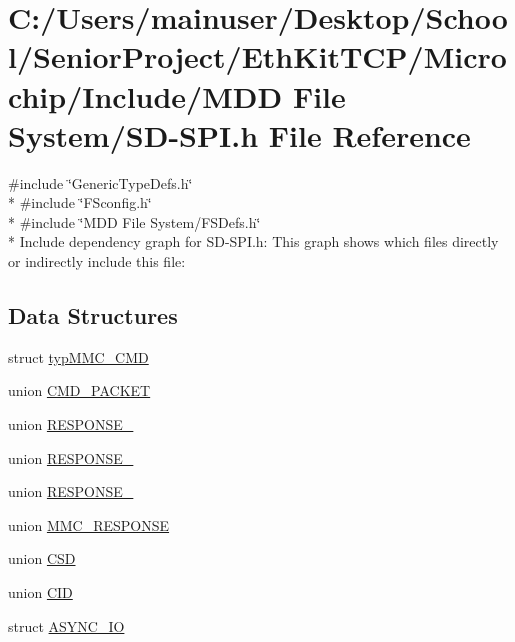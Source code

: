 \hypertarget{_s_d-_s_p_i_8h}{}\section{C\+:/\+Users/mainuser/\+Desktop/\+School/\+Senior\+Project/\+Eth\+Kit\+T\+C\+P/\+Microchip/\+Include/\+M\+D\+D File System/\+S\+D-\/\+S\+P\+I.h File Reference}
\label{_s_d-_s_p_i_8h}
{\ttfamily \#include \char`\"{}Generic\+Type\+Defs.\+h\char`\"{}}\\*
{\ttfamily \#include \char`\"{}F\+Sconfig.\+h\char`\"{}}\\*
{\ttfamily \#include \char`\"{}M\+D\+D File System/\+F\+S\+Defs.\+h\char`\"{}}\\*
Include dependency graph for S\+D-\/\+S\+P\+I.h\+:
This graph shows which files directly or indirectly include this file\+:
\subsection*{Data Structures}
\begin{DoxyCompactItemize}
\item 
struct \hyperlink{structtyp_m_m_c___c_m_d}{typ\+M\+M\+C\+\_\+\+C\+M\+D}
\item 
union \hyperlink{union_c_m_d___p_a_c_k_e_t}{C\+M\+D\+\_\+\+P\+A\+C\+K\+E\+T}
\item 
union \hyperlink{union_r_e_s_p_o_n_s_e__1}{R\+E\+S\+P\+O\+N\+S\+E\+\_}
\item 
union \hyperlink{union_r_e_s_p_o_n_s_e__2}{R\+E\+S\+P\+O\+N\+S\+E\+\_}
\item 
union \hyperlink{union_r_e_s_p_o_n_s_e__7}{R\+E\+S\+P\+O\+N\+S\+E\+\_}
\item 
union \hyperlink{union_m_m_c___r_e_s_p_o_n_s_e}{M\+M\+C\+\_\+\+R\+E\+S\+P\+O\+N\+S\+E}
\item 
union \hyperlink{union_c_s_d}{C\+S\+D}
\item 
union \hyperlink{union_c_i_d}{C\+I\+D}
\item 
struct \hyperlink{struct_a_s_y_n_c___i_o}{A\+S\+Y\+N\+C\+\_\+\+I\+O}
\end{DoxyCompactItemize}
